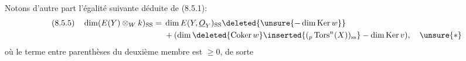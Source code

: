 Notons d'autre part l'égalité suivante déduite de (8.5.1):
\[
\begin{aligned}
(8.5.5)\quad\dim(E(Y)\otimes_W k)_{\mathrm{SS}}={}&\dim E(Y,\underline O_Y)_{\mathrm{SS}}\deleted{\unsure{-\dim\operatorname{Ker}w}}\\
&+(\dim\deleted{\operatorname{Coker}w}\inserted{({}_p\operatorname{Tors}^n(X))_{\mathrm{ss}}}-\dim\operatorname{Ker}v),\quad\unsure{*}
\end{aligned}
\]
où le terme entre parenthèses du deuxième membre est $\geq0$, de sorte 

